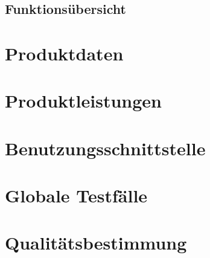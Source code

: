 \documentclass{article}
\begin{document}
\subsection{Funktionsübersicht}

\section{Produktdaten}

\section{Produktleistungen}

\section{Benutzungsschnittstelle}

\section{Globale Testfälle}

\section{Qualitätsbestimmung}
\end{document}
